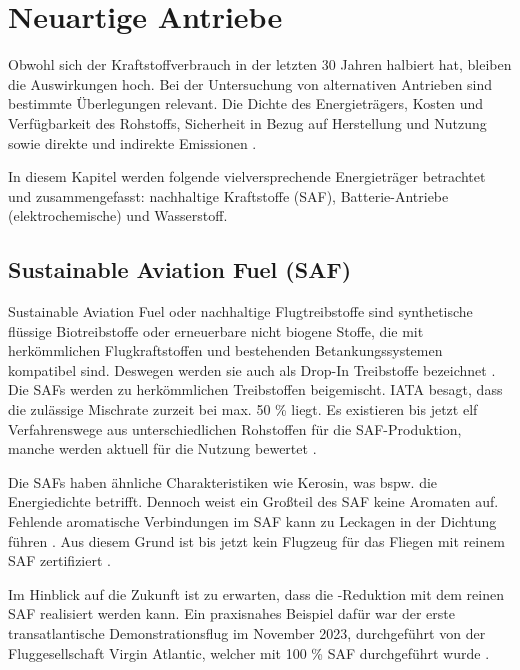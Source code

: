 
\section{Neuartige Antriebe}
\label{s:Neartige Antriebe}
Obwohl sich der Kraftstoffverbrauch in der letzten 30 Jahren halbiert \cite{mensen2013handbuch} hat, bleiben die Auswirkungen hoch.
Bei der Untersuchung von alternativen Antrieben sind bestimmte Überlegungen relevant. Die Dichte des Energieträgers, Kosten 
und Verfügbarkeit des Rohstoffs, Sicherheit in Bezug auf Herstellung und Nutzung sowie direkte und indirekte  Emissionen \cite{ansell2023review}.

In diesem Kapitel werden folgende vielversprechende Energieträger betrachtet und zusammengefasst: nachhaltige Kraftstoffe (SAF), 
Batterie-Antriebe (elektrochemische) und Wasserstoff.

\subsection{Sustainable Aviation Fuel (SAF)}

Sustainable Aviation Fuel oder nachhaltige Flugtreibstoffe sind synthetische flüssige Biotreibstoffe oder erneuerbare nicht biogene Stoffe, %
die mit herkömmlichen Flugkraftstoffen und bestehenden Betankungssystemen kompatibel sind.
Deswegen werden sie auch als Drop-In Treibstoffe bezeichnet \cite{iata_saf_2024}. 
Die SAFs werden zu herkömmlichen Treibstoffen beigemischt. IATA besagt, dass die zulässige Mischrate 
zurzeit bei max. 50 \% liegt. Es existieren bis jetzt elf Verfahrenswege aus unterschiedlichen Rohstoffen für die SAF-Produktion,
manche werden aktuell für die Nutzung bewertet \cite{icao_saf_conversion_2024}.

Die SAFs haben ähnliche Charakteristiken wie Kerosin, was bspw. die Energiedichte betrifft. Dennoch weist ein Großteil des SAF keine Aromaten auf. %
Fehlende aromatische Verbindungen im SAF kann zu Leckagen in der Dichtung führen \cite{jarin2024emissions}. 
Aus diesem Grund ist bis jetzt kein Flugzeug für das Fliegen mit reinem SAF zertifiziert \cite{iata_saf_2024}.

Im Hinblick auf die Zukunft ist zu erwarten, dass die -Reduktion mit dem reinen SAF realisiert werden kann.
Ein praxisnahes Beispiel dafür war der erste transatlantische Demonstrationsflug im November 2023, durchgeführt von der Fluggesellschaft Virgin Atlantic,
welcher mit 100 \% SAF durchgeführt wurde \cite{virginatlantic_saf_2023}. 

